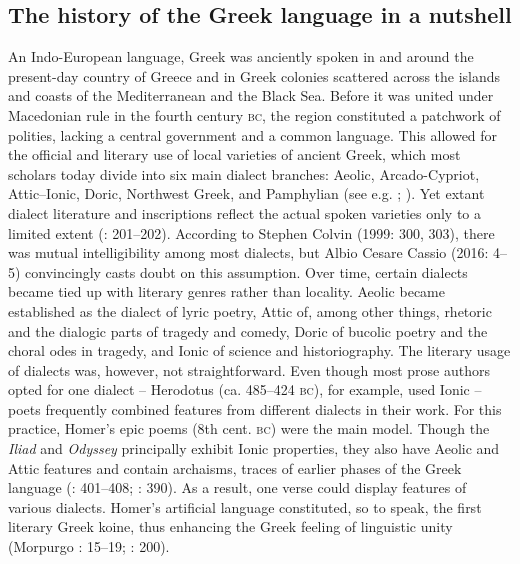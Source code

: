 \subsection{The history of the Greek language in a nutshell}
\hypertarget{Toc19704803}{}
An Indo-European language, Greek was anciently spoken in and around the present-day country of Greece and in Greek colonies scattered across the islands and coasts of the Mediterranean and the Black Sea. Before it was united under Macedonian rule in the fourth century \textsc{bc}, the region constituted a patchwork of polities, lacking a central government and a common language. This allowed for the official and literary use of local varieties of ancient Greek, which most scholars today divide into six main dialect branches: Aeolic, Arcado-Cypriot, Attic–Ionic, Doric, Northwest Greek, and Pamphylian (see e.g. \citealt{Colvin2010}; \citealt{Finkelberg2014}). Yet extant dialect literature and inscriptions reflect the actual spoken varieties only to a limited extent (\citealt{Colvin2010}: 201–202). According to Stephen Colvin (1999: 300, 303), there was mutual intelligibility among most dialects, but Albio Cesare Cassio (2016: 4–5) convincingly casts doubt on this assumption. Over time, certain dialects became tied up with literary genres rather than locality. Aeolic became established as the dialect of lyric poetry, Attic of, among other things, rhetoric and the dialogic parts of tragedy and comedy, Doric of bucolic poetry and the choral odes in tragedy, and Ionic of science and historiography. The literary usage of dialects was, however, not straightforward. Even though most prose authors opted for one dialect – Herodotus (ca. 485–424 \textsc{bc}), for example, used Ionic – poets frequently combined features from different dialects in their work. For this practice, Homer’s epic poems (8th cent. \textsc{bc}) were the main model. Though the \textit{Iliad} and \textit{Odyssey} principally exhibit Ionic properties, they also have Aeolic and Attic features and contain archaisms, traces of earlier phases of the Greek language (\citealt{Hackstein2010}: 401–408; \citealt{Tribulato2010}: 390). As a result, one verse could display features of various dialects. Homer’s artificial language constituted, so to speak, the first literary Greek koine, thus enhancing the Greek feeling of linguistic unity (Morpurgo \citealt{Davies1987}: 15–19; \citealt{Colvin2010}: 200).

